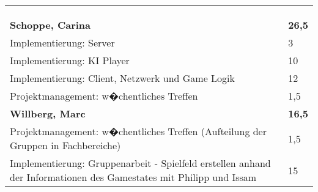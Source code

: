 \documentclass[a4paper,11pt]{scrartcl}
\begin{document}
\begin{longtable}{| p{13.8cm} | C{2.4cm} |}
	&

	\\
	\hline


	&

	\\
	\hline


	&

	\\
	\hline


	&

	\\
	\hline
	\hline


	\textbf{Schoppe, Carina} & \textbf{26,5}\\ %
	\hline

  Implementierung: Server
	&
  3
	\\
	\hline

  Implementierung: KI Player
	&
  10
	\\
	\hline

  Implementierung: Client, Netzwerk und Game Logik
	&
  12
	\\
	\hline

  Projektmanagement: w�chentliches Treffen
	&
  1,5
	\\
	\hline
	\hline


	\textbf{Willberg, Marc} & \textbf{16,5}\\ %
	\hline

  Projektmanagement: w�chentliches Treffen (Aufteilung der Gruppen in Fachbereiche)
	&
  1,5
	\\
	\hline

  Implementierung: Gruppenarbeit - Spielfeld erstellen anhand der Informationen des Gamestates mit Philipp und Issam
	&
  15
	\\
	\hline

\end{longtable}
\end{document}
